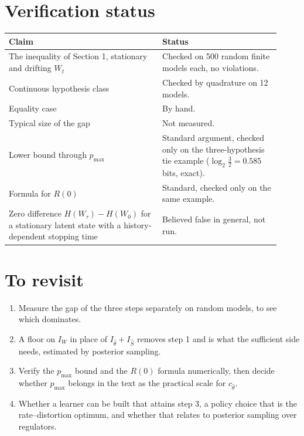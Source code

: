 \documentclass[10pt]{article}
\begin{document}
\section{Verification status}
\begin{center}
\begin{tabular}{p{0.52\linewidth}p{0.4\linewidth}}
\toprule
Claim & Status \\
\midrule
The inequality of Section 1, stationary and drifting $W_t$ & Checked on 500 random finite models each, no violations. \\
Continuous hypothesis class & Checked by quadrature on 12 models. \\
Equality case & By hand. \\
Typical size of the gap & Not measured. \\
Lower bound through $p_{\max}$ & Standard argument, checked only on the three-hypothesis tie example ($\log_2 \tfrac32 = 0.585$ bits, exact). \\
Formula for $R(0)$ & Standard, checked only on the same example. \\
Zero difference $H(W_\tau) - H(W_0)$ for a stationary latent state with a history-dependent stopping time & Believed false in general, not run. \\
\bottomrule
\end{tabular}
\end{center}

\section{To revisit}
\begin{enumerate}
  \item Measure the gap of the three steps separately on random models, to see which dominates.
  \item A floor on $I_W$ in place of $I_{\hat\theta} + I_{\hat S}$ removes step 1 and is what the sufficient side needs, estimated by posterior sampling.
  \item Verify the $p_{\max}$ bound and the $R(0)$ formula numerically, then decide whether $p_{\max}$ belongs in the text as the practical scale for $c_{\hat\theta}$.
  \item Whether a learner can be built that attains step 3, a policy choice that is the rate--distortion optimum, and whether that relates to posterior sampling over regulators.
\end{enumerate}
\end{document}
